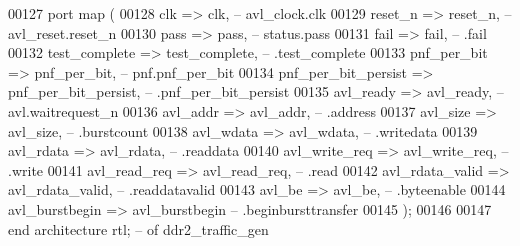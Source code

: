 \begin{DoxyCode}
00127         \textcolor{keywordflow}{port} \textcolor{keywordflow}{map} (
00128             clk                 => clk,\textcolor{keyword}{                 -- avl\_clock.clk}
00129             reset\_n             => reset\_n,\textcolor{keyword}{             -- avl\_reset.reset\_n}
00130             pass                => pass,\textcolor{keyword}{                --    status.pass}
00131             fail                => fail,\textcolor{keyword}{                --          .fail}
00132             test\_complete       => test\_complete,\textcolor{keyword}{       --          .test\_complete}
00133             pnf\_per\_bit         => pnf\_per\_bit,\textcolor{keyword}{         --       pnf.pnf\_per\_bit}
00134             pnf\_per\_bit\_persist => pnf\_per\_bit\_persist,\textcolor{keyword}{ --          .pnf\_per\_bit\_persist}
00135             avl\_ready           => avl\_ready,\textcolor{keyword}{           --       avl.waitrequest\_n}
00136             avl\_addr            => avl\_addr,\textcolor{keyword}{            --          .address}
00137             avl\_size            => avl\_size,\textcolor{keyword}{            --          .burstcount}
00138             avl\_wdata           => avl\_wdata,\textcolor{keyword}{           --          .writedata}
00139             avl\_rdata           => avl\_rdata,\textcolor{keyword}{           --          .readdata}
00140             avl\_write\_req       => avl\_write\_req,\textcolor{keyword}{       --          .write}
00141             avl\_read\_req        => avl\_read\_req,\textcolor{keyword}{        --          .read}
00142             avl\_rdata\_valid     => avl\_rdata\_valid,\textcolor{keyword}{     --          .readdatavalid}
00143             avl\_be              => avl\_be,\textcolor{keyword}{              --          .byteenable}
00144             avl\_burstbegin      => avl\_burstbegin       \textcolor{keyword}{--          .beginbursttransfer}
00145         \textcolor{vhdlchar}{)};
00146 
00147 \textcolor{keywordflow}{end} \textcolor{keywordflow}{architecture} \textcolor{vhdlchar}{rtl};\textcolor{keyword}{ -- of ddr2\_traffic\_gen}
\end{DoxyCode}
